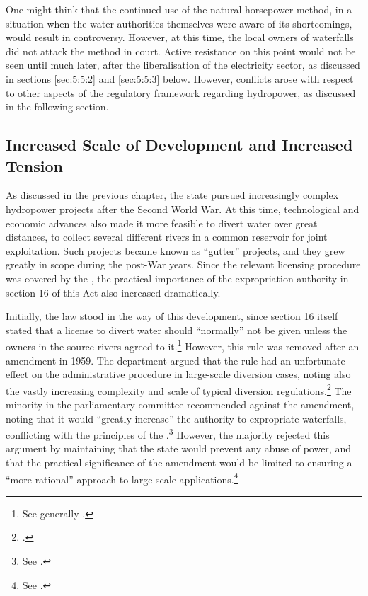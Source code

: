 One might think that the continued use of the natural horsepower method, in a situation when the water authorities themselves were aware of its shortcomings, would result in controversy. However, at this time, the local owners of waterfalls did not attack the method in court. Active resistance on this point would not be seen until much later, after the liberalisation of the electricity sector, as discussed in sections \ref{sec:5:5:2} and \ref{sec:5:5:3} below. However, conflicts arose with respect to other aspects of the regulatory framework regarding hydropower, as discussed in the following section.

\subsection{Increased Scale of Development and Increased Tension}\label{sec:5:4:2}

As discussed in the previous chapter, the state pursued increasingly complex hydropower projects after the Second World War. At this time, technological and economic advances also made it more feasible to divert water over great distances, to collect several different rivers in a common reservoir for joint exploitation. Such projects became known as ``gutter'' projects, and they grew greatly in scope during the post-War years. Since the relevant licensing procedure was covered by the \cite{wra17}, the practical importance of the expropriation authority in section 16 of this Act also increased dramatically.

Initially, the law stood in the way of this development, since section 16 itself stated that a license to divert water should ``normally'' not be given unless the owners in the source rivers agreed to it.\footnote{See generally \cite{innst59}.} However, this rule was removed after an amendment in 1959.
The department argued that the rule had an unfortunate effect on the administrative procedure in large-scale diversion cases, noting also the vastly increasing complexity and scale of typical diversion regulations.\footnote{\cite[11]{innst59}.} The minority in the parliamentary committee recommended against the amendment, noting that it would ``greatly increase'' the authority to expropriate waterfalls, conflicting with the principles of the \cite{wra40}.\footnote{See \cite[14]{innst59}.} However, the majority rejected this argument by maintaining that the state would prevent any abuse of power, and that the practical significance of the amendment would be limited to ensuring a ``more rational''  approach to large-scale applications.\footnote{See \cite[14]{innst59}.}

